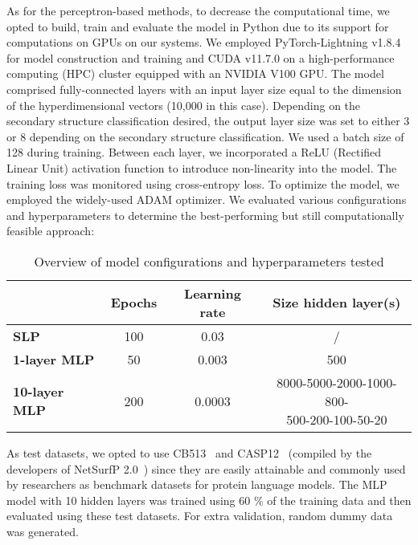 As for the perceptron-based methods, to decrease the computational time, we opted to build, train and evaluate the model in Python due to its support for computations on GPUs on our systems. We employed PyTorch-Lightning v1.8.4 for model construction and training and CUDA v11.7.0 on a high-performance computing (HPC) cluster equipped with an NVIDIA V100 GPU. The model comprised fully-connected layers with an input layer size equal to the dimension of the hyperdimensional vectors (10,000 in this case). Depending on the secondary structure classification desired, the output layer size was set to either 3 or 8 depending on the secondary structure classification. We used a batch size of 128 during training. Between each layer, we incorporated a ReLU (Rectified Linear Unit) activation function to introduce non-linearity into the model. The training loss was monitored using cross-entropy loss. To optimize the model, we employed the widely-used ADAM optimizer. We evaluated various configurations and hyperparameters to determine the best-performing but still computationally feasible approach:

\begin{table}[h]
    \caption{Overview of model configurations and hyperparameters tested}
    \label{tab:casp8}
    \centering
    \begin{tabular}{l|ccc}
        \toprule
         & Epochs & Learning rate & Size hidden layer(s)\\
        \midrule
        \textbf{SLP} & 100 & 0.03 & /\\
        \hline
        \textbf{1-layer MLP} & 50 & 0.003 & 500\\
        \hline
        \textbf{10-layer MLP} & 200 & 0.0003 & \makecell{8000-5000-2000-1000-800-\\500-200-100-50-20}\\
        \bottomrule
    \end{tabular}
  \end{table}

As test datasets, we opted to use CB513~\cite{cb513} and CASP12~\cite{casp12} (compiled by the developers of NetSurfP 2.0~\cite{netsurf}) since they are easily attainable and commonly used by researchers as benchmark datasets for protein language models. The MLP model with 10 hidden layers was trained using 60 \% of the training data and then evaluated using these test datasets. For extra validation, random dummy data was generated.

